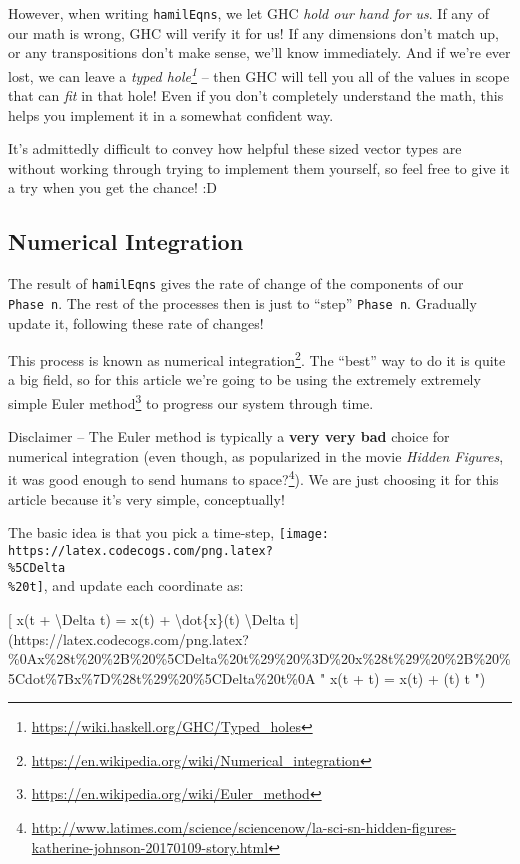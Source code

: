 \documentclass[]{article}
\renewcommand{\href}[2]{#2\footnote{\url{#1}}}
\begin{document}
However, when writing \texttt{hamilEqns}, we let GHC \emph{hold our hand for
us}. If any of our math is wrong, GHC will verify it for us! If any dimensions
don't match up, or any transpositions don't make sense, we'll know immediately.
And if we're ever lost, we can leave a
\emph{\href{https://wiki.haskell.org/GHC/Typed_holes}{typed hole}} -- then GHC
will tell you all of the values in scope that can \emph{fit} in that hole! Even
if you don't completely understand the math, this helps you implement it in a
somewhat confident way.

It's admittedly difficult to convey how helpful these sized vector types are
without working through trying to implement them yourself, so feel free to give
it a try when you get the chance! :D

\hypertarget{numerical-integration}{%
\subsection{Numerical Integration}\label{numerical-integration}}

The result of \texttt{hamilEqns} gives the rate of change of the components of
our \texttt{Phase\ n}. The rest of the processes then is just to ``step''
\texttt{Phase\ n}. Gradually update it, following these rate of changes!

This process is known as
\href{https://en.wikipedia.org/wiki/Numerical_integration}{numerical
integration}. The ``best'' way to do it is quite a big field, so for this
article we're going to be using the extremely extremely simple
\href{https://en.wikipedia.org/wiki/Euler_method}{Euler method} to progress our
system through time.

Disclaimer -- The Euler method is typically a \textbf{very very bad} choice for
numerical integration (even though, as popularized in the movie \emph{Hidden
Figures}, it was good enough to
\href{http://www.latimes.com/science/sciencenow/la-sci-sn-hidden-figures-katherine-johnson-20170109-story.html}{send
humans to space?}). We are just choosing it for this article because it's very
simple, conceptually!

The basic idea is that you pick a time-step,
\texttt{[image: https://latex.codecogs.com/png.latex?\\\%5CDelta\\\%20t]}, and
update each coordinate as:

{[} x(t + \textbackslash{}Delta t) = x(t) + \textbackslash{}dot\{x\}(t)
\textbackslash{}Delta
t{]}(https://latex.codecogs.com/png.latex?\%0Ax\%28t\%20\%2B\%20\%5CDelta\%20t\%29\%20\%3D\%20x\%28t\%29\%20\%2B\%20\%5Cdot\%7Bx\%7D\%28t\%29\%20\%5CDelta\%20t\%0A
" x(t + \Delta t) = x(t) + (t) \Delta t ")
\end{document}
